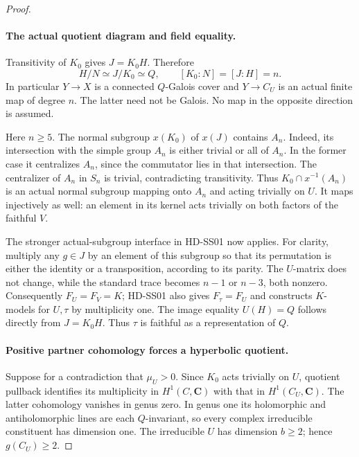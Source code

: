 \begin{proof}
\paragraph{The actual quotient diagram and field equality.}
Transitivity of \(K_0\) gives \(J=K_0H\). Therefore
\[
 H/N\simeq J/K_0\simeq Q,\qquad [K_0:N]=[J:H]=n.
 \tag{SSK.6}
\]
In particular \(Y\longrightarrow X\) is a connected \(Q\)-Galois
cover and \(Y\longrightarrow C_U\) is an actual finite map of
degree \(n\). The latter need not be Galois. No map in the
opposite direction is assumed.

Here \(n\ge5\). The normal subgroup \(x(K_0)\) of \(x(J)\)
contains \(A_n\). Indeed, its intersection with the simple group
\(A_n\) is either trivial or all of \(A_n\). In the former case
it centralizes \(A_n\), since the commutator lies in that intersection.
The centralizer of \(A_n\) in \(S_n\) is trivial, contradicting
transitivity. Thus
\(K_0\cap x^{-1}(A_n)\) is an actual normal subgroup mapping onto
\(A_n\) and acting trivially on \(U\). It maps injectively as well:
an element in its kernel acts trivially on both factors of the
faithful \(V\).

The stronger actual-subgroup interface in HD-SS01 now applies.
For clarity, multiply any \(g\in J\) by an element of this subgroup
so that its permutation is either the identity or a transposition,
according to its parity. The \(U\)-matrix does not change, while
the standard trace becomes \(n-1\) or \(n-3\), both nonzero.
Consequently \(F_U=F_V=K\); HD-SS01 also gives \(F_\tau=F_U\)
and constructs \(K\)-models for \(U,\tau\) by multiplicity one.
The image equality \(U(H)=Q\) follows directly from \(J=K_0H\).
Thus \(\tau\) is faithful as a representation of \(Q\).

\paragraph{Positive partner cohomology forces a hyperbolic quotient.}
Suppose for a contradiction that \(\mu_U>0\). Since \(K_0\)
acts trivially on \(U\), quotient pullback identifies its multiplicity
in \(H^1(C,\mathbf C)\) with that in \(H^1(C_U,\mathbf C)\).
The latter cohomology vanishes in genus zero. In genus one its
holomorphic and antiholomorphic lines are each \(Q\)-invariant,
so every complex irreducible constituent has dimension one.
The irreducible \(U\) has dimension \(b\ge2\); hence
\(g(C_U)\ge2\).


\end{proof}
